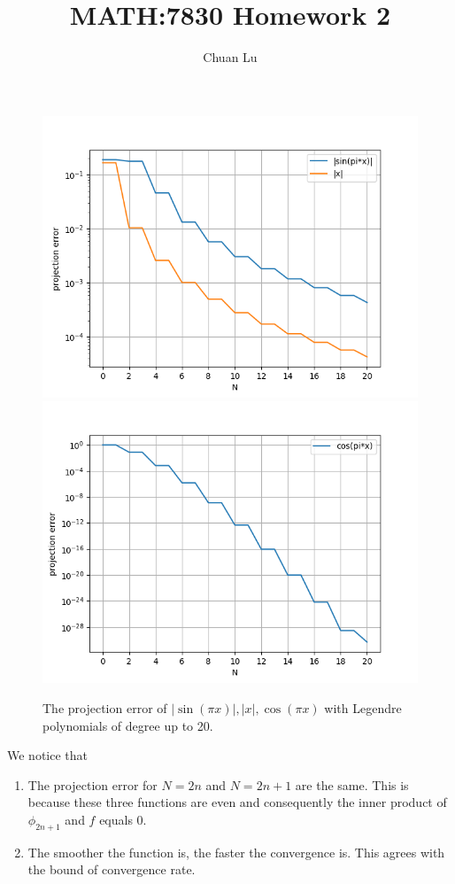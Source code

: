 \documentclass{article}
\begin{document}
\author{Chuan Lu}
\title{MATH:7830 Homework 2}
\maketitle


\begin{figure}[h]
\centering
\vbox{
\includegraphics[scale=0.5]{Figure_1.png}
\includegraphics[scale=0.5]{Figure_2.png}
} 
\caption{The projection error of $|\sin(\pi x)|, |x|, \cos(\pi x)$ with Legendre polynomials of degree up to 20.}
\end{figure}

We notice that
\begin{enumerate}
\item The projection error for $N = 2n$ and $N = 2n+1$ are the same. This is because these three functions are even and consequently the inner product of $\phi_{2n+1} $ and $f$ equals 0.

\item The smoother the function is, the faster the convergence is. This agrees with the bound of convergence rate.

\end{enumerate}
\end{document}
